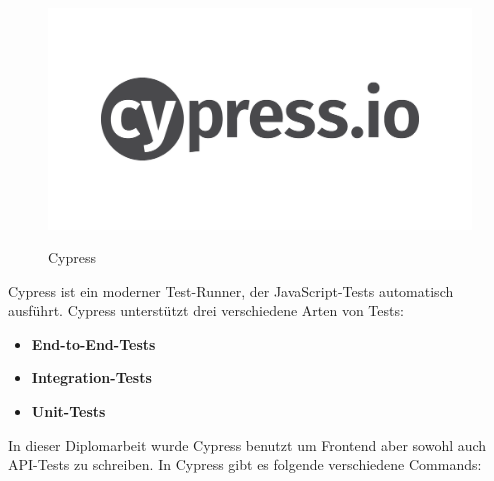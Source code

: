 \begin{figure}[h]
    \centering
    \includegraphics[width=0.3\linewidth]{pics/cypress-logo.png}
    \caption{Cypress}
    \label{fig:enter-label}
    \cite{cypress_grafik}
\end{figure}


Cypress ist ein moderner Test-Runner, der JavaScript-Tests automatisch ausführt.
Cypress unterstützt drei verschiedene Arten von Tests:

\begin{itemize}
\item \textbf{End-to-End-Tests}
\item \textbf{Integration-Tests}
\item \textbf{Unit-Tests}
\end{itemize}

In dieser Diplomarbeit wurde Cypress benutzt um Frontend aber sowohl auch API-Tests zu schreiben.
In Cypress gibt es folgende verschiedene Commands:



